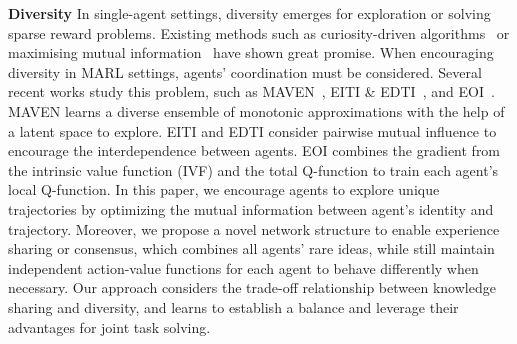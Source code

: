 \textbf{Diversity} In single-agent settings, diversity emerges for exploration or solving sparse reward problems. Existing methods such as curiosity-driven algorithms~\cite{pathak2017curiosity,burda2018exploration,badia2020never,badia2020agent57} or maximising mutual information~\cite{eysenbach2018diversity,sharma2020dynamics,campos2020explore} have shown great promise. When encouraging diversity in MARL settings, agents' coordination must be considered. Several recent works study this problem, such as MAVEN~\cite{mahajan2019maven}, EITI \& EDTI~\cite{wang2020influence}, and EOI~\cite{jiang2020emergence}. MAVEN learns a diverse ensemble of monotonic approximations with the help of a latent space to explore. EITI and EDTI consider pairwise mutual influence to encourage the interdependence between agents. EOI combines the gradient from the intrinsic value function (IVF) and the total Q-function to train each agent's local Q-function. In this paper, we encourage agents to explore unique trajectories by optimizing the mutual information between agent's identity and trajectory. Moreover, we propose a novel network structure to enable experience sharing or consensus, which combines all agents' rare ideas, while still maintain independent action-value functions for each agent to behave differently when necessary. Our approach considers the trade-off relationship between knowledge sharing and diversity, and learns to establish a balance and leverage their advantages for joint task solving. 

